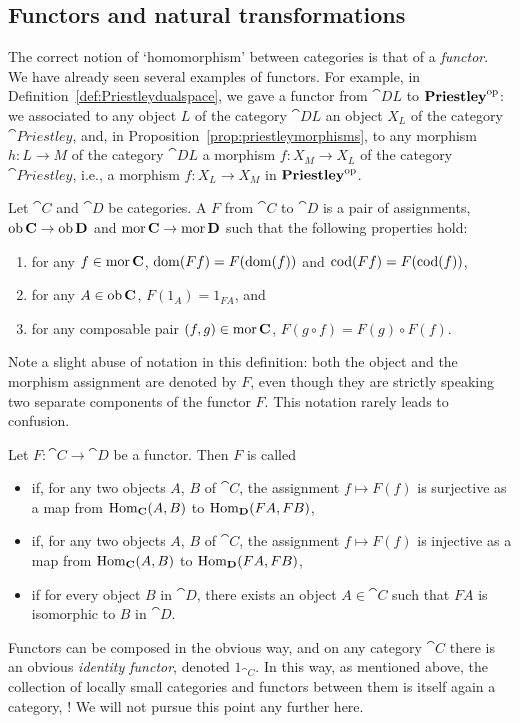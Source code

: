 \subsection*{Functors and natural transformations}
The correct notion of `homomorphism' between categories is that of a \emph{functor}. We have already seen several examples of functors. For example, in Definition~\ref{def:Priestleydualspace}, we gave a functor from $\cat{DL}$ to $\mathbf{Priestley}^{\mathrm{op}}$: we associated to any object $L$ of the category $\cat{DL}$ an object $X_L$ of the category $\cat{Priestley}$, and, in Proposition~\ref{prop:priestleymorphisms}, to any morphism $h \colon L \to M$ of the category $\cat{DL}$ a morphism $f \colon X_M \to X_L$ of the category $\cat{Priestley}$, i.e., a morphism $f \colon X_L \to X_M$ in $\mathbf{Priestley}^{\mathrm{op}}$.
\begin{definition}
Let $\cat{C}$ and $\cat{D}$ be categories. A  $F$ from $\cat{C}$ to $\cat{D}$ is a pair of assignments, $\operatorname{\mathrm{ob}} \mathbf{C} \to \operatorname{\mathrm{ob}} \mathbf{D}$ and $\operatorname{\mathrm{mor}} \mathbf{C} \to \operatorname{\mathrm{mor}} \mathbf{D}$ such that the following properties hold: 
\begin{enumerate}
  \item for any $f \in \operatorname{\mathrm{mor}} \mathbf{C}$, $\operatorname{\mathrm{dom}}(Ff) = F(\operatorname{\mathrm{dom}}(f))$ and $\operatorname{\mathrm{cod}}(Ff) = F(\operatorname{\mathrm{cod}}(f))$, 
  \item for any $A \in \operatorname{\mathrm{ob}} \mathbf{C}$, $F(1_A) = 1_{FA}$, and 
  \item for any composable pair $(f,g) \in \operatorname{\mathrm{mor}} \mathbf{C}$, $F(g \circ f) = F(g) \circ F(f)$. 
\end{enumerate}
Note a slight abuse of notation in this definition: both the object and the morphism assignment are denoted by $F$, even though they are strictly speaking two separate components of the functor $F$. This notation rarely leads to confusion.

Let $F \colon \cat{C} \to \cat{D}$ be a functor. Then $F$ is called 
\begin{itemize}
  \item {} if, for any two objects $A$, $B$ of $\cat{C}$, the assignment $f \mapsto F(f)$ is surjective as a map from $\mathrm{Hom}_{\mathbf{C}}(A,B)$ to $\mathrm{Hom}_{\mathbf{D}}(FA,FB)$,
  \item {} if, for any two objects $A$, $B$ of $\cat{C}$, the assignment $f \mapsto F(f)$ is injective as a map from  $\mathrm{Hom}_{\mathbf{C}}(A,B)$ to $\mathrm{Hom}_{\mathbf{D}}(FA,FB)$,
  \item {} if for every object $B$ in $\cat{D}$, there exists an object $A \in \cat{C}$ such that $FA$ is isomorphic to $B$ in $\cat{D}$.
\end{itemize}
\end{definition}
Functors can be composed in the obvious way, and on any category $\cat{C}$ there is an obvious \emph{identity functor}, denoted $1_{\cat{C}}$. In this way, as mentioned above, the collection of locally small categories and functors between them is itself again a category, ! We will not pursue this point any further here.

